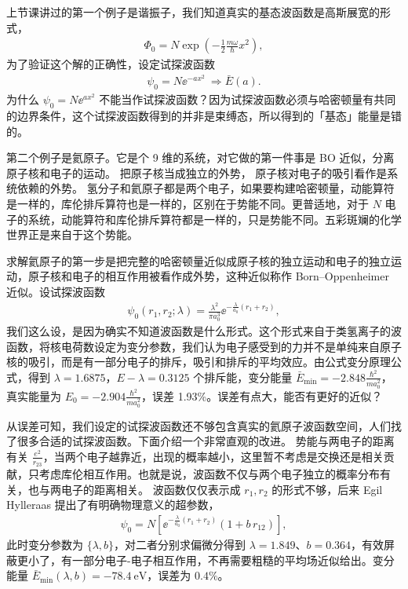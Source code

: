 上节课讲过的第一个例子是谐振子，我们知道真实的基态波函数是高斯展宽的形式，
\begin{align}
    \Phi_0 = N \exp\!\left(-\frac12 \frac{m\omega}{\hbar}x^2\right),
\end{align}
为了验证这个解的正确性，设定试探波函数
\begin{align}
    \psi_0 = N \ee^{-ax^2} \ \Rightarrow \bar E(a). 
\end{align}
为什么 $\psi_0 = N \ee^{ax^2}$ 不能当作试探波函数？因为试探波函数必须与哈密顿量有共同的边界条件，这个试探波函数得到的并非是束缚态，所以得到的「基态」能量是错的。


第二个例子是氦原子。它是个 9 维的系统，对它做的第一件事是 BO 近似，分离原子核和电子的运动。
把原子核当成独立的外势，
原子核对电子的吸引看作是系统依赖的外势。
氢分子和氦原子都是两个电子，如果要构建哈密顿量，动能算符是一样的，库伦排斥算符也是一样的，区别在于势能不同。更普适地，对于 $N$ 电子的系统，动能算符和库伦排斥算符都是一样的，只是势能不同。五彩斑斓的化学世界正是来自于这个势能。

求解氦原子的第一步是把完整的哈密顿量近似成原子核的独立运动和电子的独立运动，原子核和电子的相互作用被看作成外势，这种近似称作 Born--Oppenheimer 近似。设试探波函数
\begin{align}
    \psi_0(r_1, r_2; \lambda) = \frac{\lambda^2}{\pi a_0^3} 
    \ee^{-\frac{\lambda}{a_0}(r_1 + r_2)}, 
\end{align}
我们这么设，是因为确实不知道波函数是什么形式。这个形式来自于类氢离子的波函数，将核电荷数设定为变分参数，我们认为电子感受到的力并不是单纯来自原子核的吸引，而是有一部分电子的排斥，吸引和排斥的平均效应。由公式变分原理公式，得到 $\lambda = \num{1.6875}$，$E-\lambda = 0.3125$ 个排斥能，变分能量 $\bar E_{\mathrm{min}} = -\num{2.848} \frac{\hbar^2}{ma_0^2}$，真实能量为 $E_0 = -2.904 \frac{\hbar^2}{ma_0^2}$，误差 1.93\%。误差有点大，能否有更好的近似？

从误差可知，我们设定的试探波函数还不够包含真实的氦原子波函数空间，人们找了很多合适的试探波函数。下面介绍一个非常直观的改进。
势能与两电子的距离有关 $\frac{e^2}{r_{23}}$，当两个电子越靠近，出现的概率越小，这里暂不考虑是交换还是相关贡献，只考虑库伦相互作用。也就是说，波函数不仅与两个电子独立的概率分布有关，也与两电子的距离相关。
波函数仅仅表示成 $r_1, r_2$ 的形式不够，后来 Egil Hylleraas 提出了有明确物理意义的超参数，
\begin{align}
    \psi_0 = N \left[
        \ee^{-\frac{\lambda}{a_0}(r_1+r_2)}(1 + b\, r\!_{12})
    \right],
\end{align}
此时变分参数为 $\{\lambda, b\}$，对二者分别求偏微分得到 $\lambda = 1.849$、$b = 0.364$，有效屏蔽更小了，有一部分电子-电子相互作用，不再需要粗糙的平均场近似给出。变分能量 $\bar E_{\mathrm{min}}(\lambda, b) = \SI{-78.4}{\electronvolt}$，误差为 $0.4\%$。

